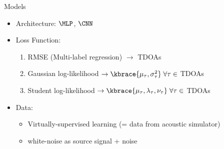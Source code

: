 \begin{frame}{Models \hfill\faBrain}
    \vspace{-3mm}
    \begin{itemize}
        \item Architecture: $\MLP$, $\CNN$~{\footnotesize\cite{chakrabarty2017broadband,nguyen2018autonomous}}
        \item Loss Function:
        \begin{enumerate}
            \item RMSE (Multi-label regression) $\to$ TDOAs
            \item Gaussian log-likelihood $\to \kbrace{\mu_\tau, \sigma^2_\tau} \;\forall \tau \in$ TDOAs \hspace{1em}
            \item Student log-likelihood $\to \kbrace{\mu_\tau, \lambda_\tau, \nu_\tau} \;\forall \tau \in$ TDOAs 
        \end{enumerate}
        \item Data:
        \begin{itemize}
            \item Virtually-supervised learning (= data from acoustic simulator)
            \item white-noise as source signal + noise
        \end{itemize}
    \end{itemize}



    \vfill

\end{frame}

